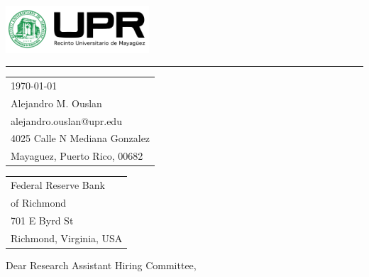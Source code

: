 \documentclass{article}
\begin{document}

\includegraphics[width=0.4\textwidth]{../assets/logo.png} %

\vspace{-1em} %

\rule{\linewidth}{1pt} %

\bigskip\bigskip %


\hfill
\begin{tabular}{l @{}}
\hfill \today \bigskip\\ %
\hfill Alejandro M. Ouslan \\
\hfill alejandro.ouslan@upr.edu \\
\hfill 4025 Calle N Mediana Gonzalez\\
\hfill Mayaguez, Puerto Rico, 00682 \\
\end{tabular}

\bigskip %


\begin{tabular}{@{} l}
Federal Reserve Bank \\ 
of Richmond \\
701 E Byrd St\\
Richmond, Virginia, USA\\
\end{tabular}


\bigskip %

Dear Research Assistant Hiring Committee,

\bigskip %
\end{document}
